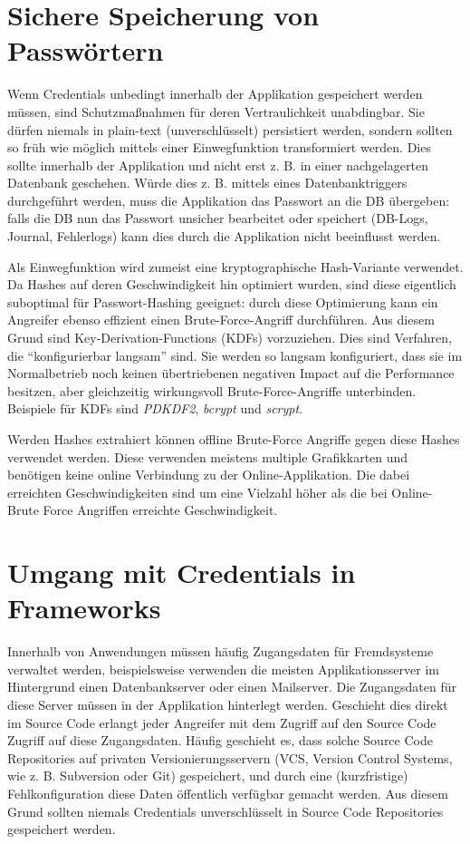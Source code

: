 \section{Sichere Speicherung von Passwörtern}

Wenn Credentials unbedingt innerhalb der Applikation gespeichert werden müssen, sind Schutzmaßnahmen für deren Vertraulichkeit unabdingbar. Sie dürfen niemals in plain-text (unverschlüsselt) persistiert werden, sondern sollten so früh wie möglich mittels einer Einwegfunktion transformiert werden. Dies sollte innerhalb der Applikation und nicht erst z. B. in einer nachgelagerten Datenbank geschehen. Würde dies z. B. mittels eines Datenbanktriggers durchgeführt werden, muss die Applikation das Passwort an die DB übergeben: falls die DB nun das Passwort unsicher bearbeitet oder speichert (DB-Logs, Journal, Fehlerlogs) kann dies durch die Applikation nicht beeinflusst werden.

Als Einwegfunktion wird zumeist eine kryptographische Hash-Variante verwendet. Da Hashes auf deren Geschwindigkeit hin optimiert wurden, sind diese eigentlich suboptimal für Passwort-Hashing geeignet: durch diese Optimierung kann ein Angreifer ebenso effizient einen Brute-Force-Angriff durchführen. Aus diesem Grund sind Key-Derivation-Functions (KDFs) vorzuziehen. Dies sind Verfahren, die ``konfigurierbar langsam'' sind. Sie werden so langsam konfiguriert, dass sie im Normalbetrieb noch keinen übertriebenen negativen Impact auf die Performance besitzen, aber gleichzeitig wirkungsvoll Brute-Force-Angriffe unterbinden. Beispiele für KDFs sind \textit{PDKDF2}, \textit{bcrypt} und \textit{scrypt}.

Werden Hashes extrahiert können offline Brute-Force Angriffe gegen diese Hashes verwendet werden. Diese verwenden meistens multiple Grafikkarten und benötigen keine online Verbindung zu der Online-Applikation. Die dabei erreichten Geschwindigkeiten sind um eine Vielzahl höher als die bei Online-Brute Force Angriffen erreichte Geschwindigkeit.

\section{Umgang mit Credentials in Frameworks}

Innerhalb von Anwendungen müssen häufig Zugangsdaten für Fremdsysteme verwaltet werden, beispielsweise verwenden die meisten Applikationsserver im Hintergrund einen Datenbankserver oder einen Mailserver. Die Zugangsdaten für diese Server müssen in der Applikation hinterlegt werden. Geschieht dies direkt im Source Code erlangt jeder Angreifer mit dem Zugriff auf den Source Code Zugriff auf diese Zugangsdaten. Häufig geschieht es, dass solche Source Code Repositories auf privaten Versionierungsservern (VCS, Version Control Systems, wie z. B. Subversion oder Git) gespeichert, und durch eine (kurzfristige) Fehlkonfiguration diese Daten öffentlich verfügbar gemacht werden. Aus diesem Grund sollten niemals Credentials unverschlüsselt in Source Code Repositories gespeichert werden.

